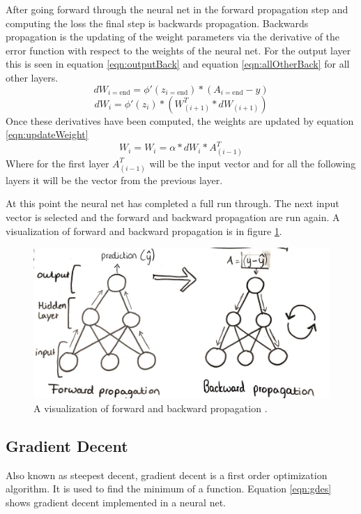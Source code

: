 \documentclass[12pt]{article}
\begin{document}
	After going forward through the neural net in the forward propagation step and computing the loss the final step is backwards propagation. Backwards propagation is the updating of the weight parameters via the derivative of the error function with respect to the weights of the neural net. For the output layer this is seen in equation \ref{eqn:outputBack} and equation \ref{eqn:allOtherBack} for all other layers.
	\begin{equation}
	dW_{i=\text{end}}=\phi'(z_{i=\text{end}})*\left(A_{i=\text{end}}-y\right)
	\label{eqn:outputBack}
	\end{equation}
	\begin{equation}
	dW_i=\phi'(z_i)*\left(W_{\left(i+1\right)}^T*dW_{\left(i+1\right)}\right)
	\label{eqn:allOtherBack}
	\end{equation}
	Once these derivatives have been computed, the weights are updated by equation \ref{eqn:updateWeight}
	\begin{equation}
	W_i = W_i=\alpha*dW_{i}*A_{\left(i-1\right)}^T
	\label{eqn:updateWeight}
	\end{equation}
	Where for the first layer $A_{\left(i-1\right)}^T$ will be the input vector and for all the following layers it will be the vector from the previous layer. \par 
	At this point the neural net has completed a full run through. The next input vector is selected and the forward and backward propagation are run again. A visualization of forward and backward propagation is in figure \ref{fig:forwardbackwardprop}.
	
	\begin{figure}
		\centering
		\includegraphics[width=0.7\linewidth]{forwardBackwardProp}
		\caption{A visualization of forward and backward propagation \cite{nnBlog}.}
		\label{fig:forwardbackwardprop}
	\end{figure}
	\subsection{Gradient Decent}
	Also known as steepest decent, gradient decent is a first order optimization algorithm. It is used to find the minimum of a function. Equation \ref{eqn:gdes} shows gradient decent implemented in a neural net. 
	
\end{document}
